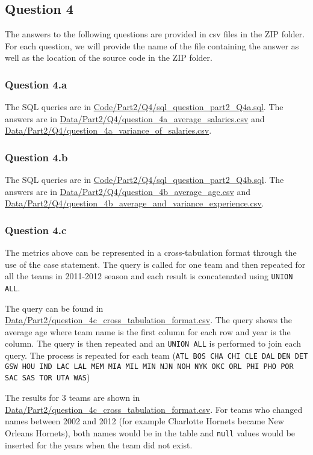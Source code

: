 
\subsection{Question 4}
\label{subsec:414}

The answers to the following questions are provided in csv files in the ZIP folder. For each question, we will provide the name of the file containing the answer as well as the location of the source code in the ZIP folder.

\subsubsection{Question 4.a}
\label{subsubsec:414a}

The SQL queries are in \url{Code/Part2/Q4/sql_question_part2_Q4a.sql}. The answers are in \url{Data/Part2/Q4/question_4a_average_salaries.csv} and \url{Data/Part2/Q4/question_4a_variance_of_salaries.csv}.

\subsubsection{Question 4.b}
\label{subsubsec:414b}

The SQL queries are in \url{Code/Part2/Q4/sql_question_part2_Q4b.sql}. The answers are in \url{Data/Part2/Q4/question_4b_average_age.csv} and \url{Data/Part2/Q4/question_4b_average_and_variance_experience.csv}.

\subsubsection{Question 4.c}
\label{subsubsec:414c}

The metrics above can be represented in a cross-tabulation format through the use of the case statement. The query is called for one team and then repeated for all the teams in 2011-2012 season and each result is concatenated using \verb|UNION ALL|. 

The query can be found in \url{Data/Part2/question_4c_cross_tabulation_format.csv}.
The query shows the average age where team name is the first column for each row and year is the column. The query is then repeated and an \verb|UNION ALL| is performed to join each query. The process is repeated for each team (\verb|ATL BOS CHA CHI CLE DAL|  \verb|DEN DET GSW HOU IND LAC LAL MEM MIA MIL MIN NJN NOH NYK OKC ORL PHI PHO POR SAC SAS TOR UTA WAS|)

The results for 3 teams are shown in \url{Data/Part2/question_4c_cross_tabulation_format.csv}.  For teams who changed names between 2002 and 2012 (for example Charlotte Hornets became New Orleans Hornets), both names would be in the table and \verb|null| values would be inserted for the years when the team did not exist. 
